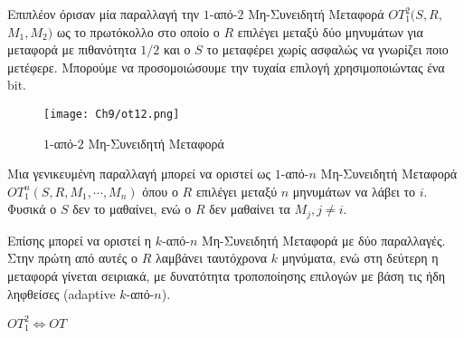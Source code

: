 Επιπλέον όρισαν μία παραλλαγή την $1$-από-$2$ Μη-Συνειδητή Μεταφορά $OT_1^2(S,R,$ $M_1,M_2)$ ως το πρωτόκολλο στο οποίο ο $R$ επιλέγει μεταξύ δύο μηνυμάτων για μεταφορά με πιθανότητα ${1}/{2}$ και ο $S$ το μεταφέρει χωρίς ασφαλώς  να γνωρίζει ποιο μετέφερε. Μπορούμε να προσομοιώσουμε την τυχαία επιλογή χρησιμοποιώντας ένα bit.

\begin{figure}
	\centering
		\texttt{[image: Ch9/ot12.png]}
	\caption{$1$-από-$2$ Μη-Συνειδητή Μεταφορά}
	\label{fig:OT12}
\end{figure}

Μια γενικευμένη παραλλαγή μπορεί να οριστεί ως $1$-από-$n$ Μη-Συνειδητή Μεταφορά $OT_1^n(S,R,M_1,\cdots,M_n)$ όπου ο $R$ επιλέγει μεταξύ $n$ μηνυμάτων να λάβει το $i$. Φυσικά ο $S$ δεν το μαθαίνει, ενώ ο $R$ δεν μαθαίνει τα $M_j, j \neq i$.

Επίσης μπορεί να οριστεί η $k$-από-$n$ Μη-Συνειδητή Μεταφορά με δύο παραλλαγές. Στην πρώτη από αυτές ο $R$ λαμβάνει ταυτόχρονα $k$ μηνύματα, ενώ στη δεύτερη η μεταφορά γίνεται σειριακά, με δυνατότητα τροποποίησης επιλογών με βάση τις ήδη ληφθείσες (adaptive $k$-από-$n$). 

\begin{theorem} 
$OT_1^2 \Leftrightarrow OT$
\end{theorem}

